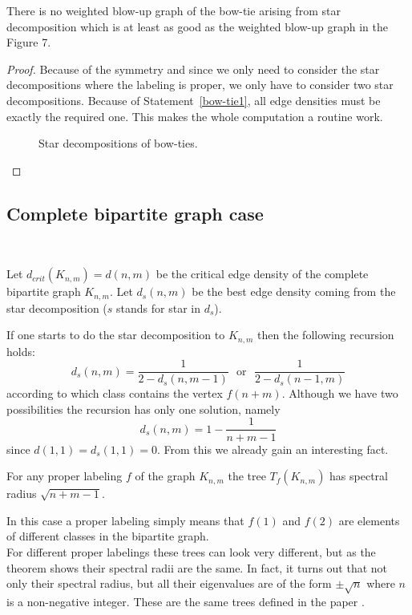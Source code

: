 \documentclass[12pt,a4paper]{amsart}
\numberwithin{equation}{section}
\begin{document}
\begin{prop} There is no weighted blow-up graph of the bow-tie arising from
  star decomposition which is at least as good as the weighted blow-up graph
  in the Figure 7.
\end{prop}

\begin{proof} Because of the symmetry and since we only need to consider the
  star decompositions where the labeling is proper, we only have to consider
  two star decompositions. Because of
  Statement~\ref{bow-tie1}, all edge densities must be exactly the required
  one. This makes the whole computation a routine work.
 
 \begin{figure}[h!] \label{bow-ties}
\begin{center}
\caption{Star decompositions of
  bow-ties.}    
\end{center}
\end{figure}

\end{proof} 

\subsection{Complete bipartite graph case}\ \ 
\bigskip

Let $d_{crit}(K_{n,m})=d(n,m)$ be the critical edge density of the complete
bipartite graph $K_{n,m}$. Let $d_s(n,m)$ be the best edge density coming from
the star decomposition ($s$ stands for star in $d_s$). 

If one starts to do the star decomposition to $K_{n,m}$ then
the following recursion holds:
$$d_s(n,m)=\frac{1}{2-d_s(n,m-1)}\ \ \  \mbox{or}\ \ \  \frac{1}{2-d_s(n-1,m)}$$
according to which class contains the vertex $f(n+m)$. Although we have two
possibilities the recursion has only one solution, namely 
$$d_s(n,m)=1-\frac{1}{n+m-1}$$
since $d(1,1)=d_s(1,1)=0$. From this we already gain an interesting fact.

\begin{theorem} \label{BT1} For any proper labeling $f$ of the graph $K_{n,m}$
  the tree $T_f(K_{n,m})$ has spectral radius $\sqrt{n+m-1}$.  
\end{theorem}

\begin{remark} In this case a proper labeling simply means that $f(1)$ and
  $f(2)$ are elements of  different classes in the bipartite graph. \\
For different proper labelings these trees can look very different, but as
the theorem shows their spectral radii are the same. In fact, it turns out
that not only their spectral radius, but all their eigenvalues are of the form
$\pm\sqrt{n}$ where $n$ is a non-negative integer. These are the same trees
defined in the paper \cite{csiki}. 
\end{remark} 
\end{document}
